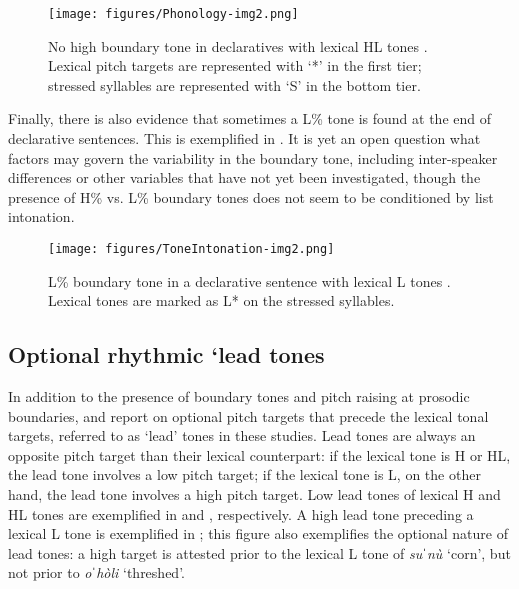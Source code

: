 \begin{figure}
\texttt{[image: figures/Phonology-img2.png]}
\caption{
\label{fig: no H boundary tone in declaratives with lexical HL tones}
No high boundary tone in declaratives with lexical HL tones \parencite{garellek2015lexical}.  Lexical pitch targets are represented with `*' in the first tier; stressed syllables are represented with `S' in the bottom tier.}
\end{figure}

Finally, there is also evidence that sometimes a L\% tone is found at the end of declarative sentences. This is exemplified in . It is yet an open question what factors may govern the variability in the boundary tone, including inter-speaker differences or other variables that have not yet been investigated, though the presence of H\% vs. L\% boundary tones does not seem to be conditioned by list intonation.

\begin{figure}
\texttt{[image: figures/ToneIntonation-img2.png]}
\caption{
\label{fig: L boundary tone in declaratives with lexical L tones}
L\% boundary tone in a declarative sentence with lexical L tones \parencite{kubuzono2020raramuri}. Lexical tones are marked as L* on the stressed syllables.}
\end{figure}

\subsection{Optional rhythmic `lead tones}
\label{subsec: optional rhythmic lead tones}

In addition to the presence of boundary tones and pitch raising at prosodic boundaries, \citet{garellek2015lexical} and \citet{kubuzono2020raramuri} report on optional pitch targets that precede the lexical tonal targets, referred to as `lead' tones in these studies. Lead tones are always an opposite pitch target than their lexical counterpart: if the lexical tone is H or HL, the lead tone involves a low pitch target; if the lexical tone is L, on the other hand, the lead tone involves a high pitch target. Low lead tones of lexical H and HL tones are exemplified in  and , respectively. A high lead tone preceding a lexical L tone is exemplified in ; this figure also exemplifies the optional nature of lead tones: a high target is attested prior to the lexical L tone of \textit{suˈnù} `corn', but not prior to \textit{oˈhòli} `threshed'.


